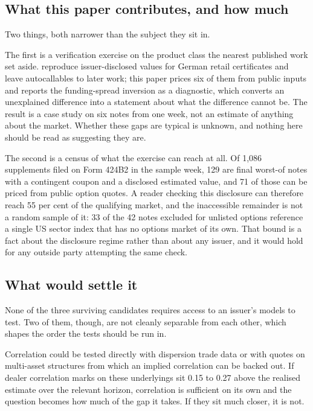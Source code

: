 \subsection*{What this paper contributes, and how much}

Two things, both narrower than the subject they sit in.

The first is a verification exercise on the product class the nearest published
work set aside. \citet{Bauer2020} reproduce issuer-disclosed values for German
retail certificates and leave autocallables to later work; this paper prices
six of them from public inputs and reports the funding-spread inversion as a
diagnostic, which converts an unexplained difference into a statement about
what the difference cannot be. The result is a case study on six notes from one
week, not an estimate of anything about the market. Whether these gaps are
typical is unknown, and nothing here should be read as suggesting they are.

The second is a census of what the exercise can reach at all. Of 1{,}086
supplements filed on Form 424B2 in the sample week, 129 are final worst-of
notes with a contingent coupon and a disclosed estimated value, and 71 of those
can be priced from public option quotes. A reader checking this disclosure can
therefore reach 55 per cent of the qualifying market, and the inaccessible
remainder is not a random sample of it: 33 of the 42 notes excluded for
unlisted options reference a single US sector index that has no options market
of its own. That bound is a fact about the disclosure regime rather than about
any issuer, and it would hold for any outside party attempting the same check.

\subsection*{What would settle it}

None of the three surviving candidates requires access to an issuer's models to
test. Two of them, though, are not cleanly separable from each other, which
shapes the order the tests should be run in.

Correlation could be tested directly with dispersion trade data or with quotes
on multi-asset structures from which an implied correlation can be backed out.
If dealer correlation marks on these underlyings sit 0.15 to 0.27 above the
realised estimate over the relevant horizon, correlation is sufficient on its
own and the question becomes how much of the gap it takes. If they sit much
closer, it is not.

